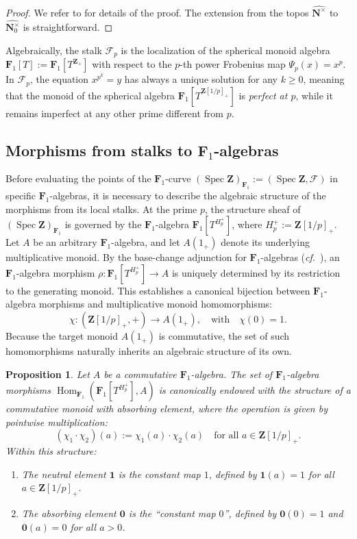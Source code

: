\documentclass[11pt,a4paper]{article}
\newtheorem{proposition}[theorem]{Proposition}
\newcommand{\N}{\mathbf{N}}
\newcommand{\Z}{\mathbf{Z}}
\newcommand{\Fone}{\mathbf{F}_{1}}
\def\spz{\Spec \Z}
\def\spzf{(\Spec \Z)_{\mathbf{F}_{1}}}
\newcommand{\nat}{\widehat{\N^\times}}
\newcommand{\nato}{\widehat{\N^\times_0}}
\newcommand{\Spec}{\operatorname{Spec}}
\def\cf{{\it cf.\/}\ }
\begin{document}
\begin{proof}
We refer to \cite{Xu} for details of the proof. The extension from the topos $\nat$ to $\nato$ is straightforward.
\end{proof}

Algebraically, the stalk $\mathcal{F}_p$ is the  localization of the spherical monoid  algebra $\Fone[T]:=\Fone[T^{\Z_+}]$ with respect to the $p$-th power Frobenius map $\Psi_p(x) = x^p$. In $\mathcal{F}_p$, the equation $x^{p^k} = y$  has always a unique solution for any $k \ge 0$, meaning that the monoid of the spherical algebra $\Fone[T^{\Z[1/p]_+}]$ is \emph{perfect at $p$}, while it remains imperfect at any other prime different from $p$.


\subsection{Morphisms from stalks to $\Fone$-algebras}

Before evaluating the points of the $\Fone$-curve $\spzf:=(\spz,\mathcal F)$ in specific $\Fone$-algebras, it is necessary to describe the algebraic structure of the morphisms from its local stalks. At the prime $p$, the structure sheaf of $\spzf$ is governed by the $\Fone$-algebra $\Fone[T^{H_p^+}]$, where $H_p^+ := \Z[1/p]_+$. Let $A$ be an arbitrary  $\Fone$-algebra, and let $A(1_+)$ denote its underlying multiplicative monoid. By the base-change adjunction for $\Fone$-algebras (\cf \cite[Proposition 2.2]{CC4}), an $\Fone$-algebra morphism $\rho: \Fone[T^{H_p^+}] \to A$ is uniquely determined by its restriction to the generating monoid. This establishes a canonical bijection between $\Fone$-algebra morphisms and multiplicative monoid homomorphisms:
\[
\chi : (\Z[1/p]_+, +) \longrightarrow A(1_+), \quad \text{with} \quad \chi(0)=1.
\]
Because the target monoid $A(1_+)$ is commutative, the set of such homomorphisms naturally inherits an algebraic structure of its own.

\begin{proposition}\label{prop:monoid_structure_morphisms}
Let $A$ be a commutative $\Fone$-algebra. The set of $\Fone$-algebra morphisms \sloppy $\operatorname{Hom}_{\Fone}(\Fone[T^{H_p^+}], A)$ is canonically endowed with the structure of a commutative monoid with absorbing element, where the operation is given by pointwise multiplication:
\[
(\chi_1 \cdot \chi_2)(a) := \chi_1(a) \cdot \chi_2(a) \quad \text{for all } a \in \Z[1/p]_+.
\]
Within this structure:
\begin{enumerate}
    \item The neutral element $\mathbf{1}$ is the constant map $1$, defined by $\mathbf{1}(a) = 1$ for all $a \in \Z[1/p]_+$.
    \item The absorbing element $\mathbf{0}$ is the ``constant map $0$'', defined by $\mathbf{0}(0) = 1$ and $\mathbf{0}(a) = 0$ for all $a > 0$.
\end{enumerate}
\end{proposition}
\end{document}
